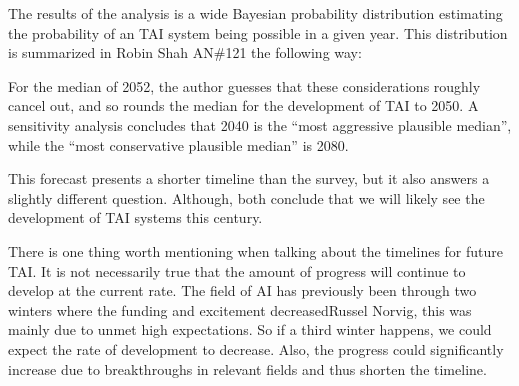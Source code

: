 \documentclass[12pt,A4]{report}
\newcommand{\autobaj}{}
\theoremstyle{definition}
\begin{document}
The results of the analysis is a wide Bayesian probability distribution estimating the probability of an TAI system being possible in a given year. This distribution is summarized in \autobaj{Robin Shah AN\#121} the following way:
\begin{displayquote}
For the median of 2052, the author guesses that these considerations roughly cancel out, and so rounds the median for the development of TAI to 2050. A sensitivity analysis concludes that 2040 is the “most aggressive plausible median”, while the “most conservative plausible median” is 2080.
\end{displayquote}
This forecast presents a shorter timeline than the survey, but it also answers a slightly different question. Although, both conclude that we will likely see the development of TAI systems this century.  

There is one thing worth mentioning when talking about the timelines for future TAI. It is not necessarily true that the amount of progress will continue to develop at the current rate. The field of AI has previously been through two winters where the funding and excitement decreased\autobaj{Russel Norvig}, this was mainly due to unmet high expectations. So if a third winter happens, we could expect the rate of development to decrease. Also, the progress could significantly increase due to breakthroughs in relevant fields and thus shorten the timeline.

\end{document}

